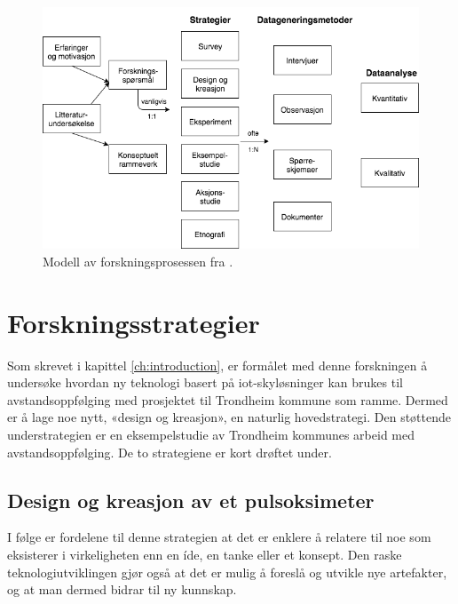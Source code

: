\begin{figure}
\centering
\includegraphics[width=\textwidth]{fig/oates/oates_research_norwegian}
\caption{Modell av forskningsprosessen fra \citet{oates}.}
\label{fig:oates_model}
\end{figure}

\section{Forskningsstrategier}
Som skrevet i kapittel \ref{ch:introduction}, er formålet med denne forskningen å undersøke hvordan ny teknologi basert
på \gls{iot}-skyløsninger kan brukes til avstandsoppfølging med prosjektet til Trondheim kommune som ramme. Dermed er å lage noe nytt,
«design og kreasjon», en naturlig hovedstrategi. Den støttende understrategien er en eksempelstudie av Trondheim kommunes arbeid
med avstandsoppfølging. De to strategiene er kort drøftet under.

\subsection{Design og kreasjon av et pulsoksimeter}

I følge \citet[s.121-122]{oates} er fordelene til denne strategien at det er enklere å relatere til noe som eksisterer i virkeligheten enn en íde, en tanke eller et konsept.
Den raske teknologiutviklingen gjør også at det er mulig å foreslå og utvikle nye artefakter, og at man dermed bidrar til ny kunnskap.


